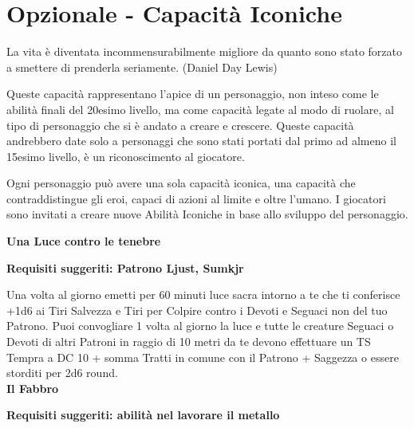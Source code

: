 \section{Opzionale - Capacità Iconiche}\hypertarget{abilitaiconiche}{}\label{abilitaiconiche}


\begin{changemargin}{0.3cm}{0.3cm}\begin{enfasi}{
La vita è diventata incommensurabilmente migliore da quanto sono stato forzato a smettere di prenderla seriamente. (Daniel Day Lewis)
}\end{enfasi}\end{changemargin}\medskip


\begin{multicols}{2}


Queste capacità rappresentano l'apice di un personaggio, non inteso come le abilità finali del 20esimo livello, ma come capacità legate al modo di ruolare, al tipo di personaggio che si è andato a creare e crescere. Queste capacità andrebbero date solo a personaggi che sono stati portati dal primo ad almeno il 15esimo livello, è un riconoscimento al giocatore.

Ogni personaggio può avere una sola capacità iconica, una capacità che contraddistingue gli eroi, capaci di azioni al limite e oltre l'umano. I giocatori sono invitati a creare nuove Abilità Iconiche in base allo sviluppo del personaggio.

\medskip

\Large\textbf{Una Luce contro le tenebre}\normalsize{}


\textbf{Requisiti suggeriti: Patrono Ljust, Sumkjr}

Una volta al giorno emetti per 60 minuti luce sacra intorno a te che ti conferisce +1d6 ai Tiri Salvezza e Tiri per Colpire contro i Devoti e Seguaci non del tuo Patrono. Puoi convogliare 1 volta al giorno la luce e tutte le creature Seguaci o Devoti di altri Patroni in raggio di 10 metri da te devono effettuare un TS Tempra a DC 10 + somma Tratti in comune con il Patrono + Saggezza o essere storditi per 2d6 round.\\

\Large\textbf{Il Fabbro}\normalsize{}

\textbf{Requisiti suggeriti: abilità nel lavorare il metallo}


\end{multicols}
